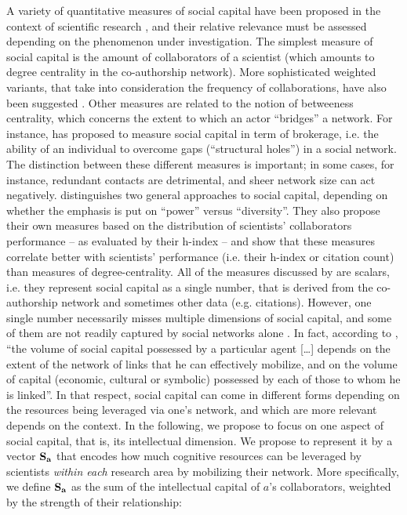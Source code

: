\documentclass{article}
\begin{document}
A variety of quantitative measures of social capital have been proposed in the context of scientific research \citep{Abbasi2014,Schirone2023}, and their relative relevance must be assessed depending on the phenomenon under investigation. The simplest measure of social capital is the amount of collaborators of a scientist (which amounts to degree centrality in the co-authorship network). More sophisticated weighted variants, that take into consideration the frequency of collaborations, have also been suggested \citep{Abbasi2014}. Other measures are related to the notion of betweeness centrality, which concerns the extent to which an actor ``bridges'' a network. For instance, \citet{BurtBrokerage2007} has proposed to measure social capital in term of brokerage, i.e. the ability of an individual to overcome gaps (``structural holes'') in a social network. The distinction between these different measures is important; in some cases, for instance, redundant contacts are detrimental, and sheer network size can act negatively. \citet{Abbasi2014} distinguishes two general approaches to social capital, depending on whether the emphasis is put on ``power'' versus ``diversity''. They also propose their own measures based on the distribution of scientists' collaborators performance -- as evaluated by their h-index -- and show that these measures correlate better with scientists' performance (i.e. their h-index or citation count) than measures of degree-centrality. All of the measures discussed by \citet{Abbasi2014} are scalars, i.e. they represent social capital as a single number, that is derived from the co-authorship network and sometimes other data (e.g. citations). However, one single number necessarily misses multiple dimensions of social capital, and some of them are not readily captured by social networks alone \citep{MartnAlczar2019}. In fact, according to \citet{Bourdieu1980}, ``the volume of social capital possessed by a particular agent [\dots] depends on the extent of the network of links that he can effectively mobilize, and on the volume of capital (economic, cultural or symbolic) possessed by each of those to whom he is linked''. In that respect, social capital can come in different forms depending on the resources being leveraged via one's network, and which are more relevant depends on the context. In the following, we propose to focus on one aspect of social capital, that is, its intellectual dimension. We propose to represent it by a vector $\bf{S}_{a}$ that encodes how much cognitive resources can be leveraged by scientists \textit{within each} research area by mobilizing their network. %
More specifically, we define $\bf{S}_{a}$ as the sum of the intellectual capital of $a$'s collaborators, weighted by the strength of their relationship:
\end{document}
